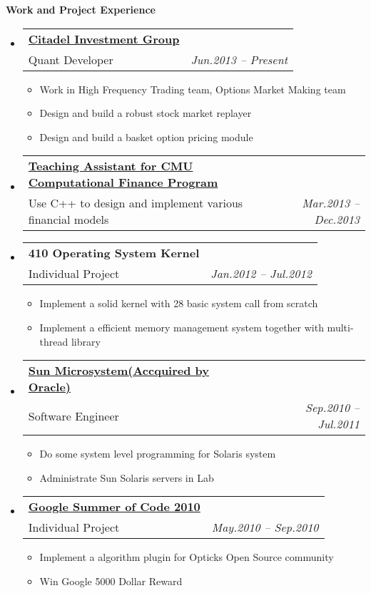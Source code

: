 \documentclass[letterpaper,11pt]{article}
\makeatletter
\newcommand{\resitem}[1]{\item #1 \vspace{-2pt}}
\newcommand{\resheading}[1]{{\large \colorbox{mygrey}{\begin{minipage}{\textwidth}{\textbf{#1 \vphantom{p\^{E}}}}\end{minipage}}}}
\newcommand{\ressubheading}[4]{
\begin{tabular*}{6.5in}{l@{\extracolsep{\fill}}r}
		\textbf{#1} & #2 \\
		{#3}{} & \textit{#4} \\
\end{tabular*}\vspace{-6pt}}
\makeatother
\begin{document}
\resheading{Work and Project Experience}
	\begin{itemize}
    \item
      \ressubheading{\href{http://www.citadel.com}
      {Citadel Investment Group}}{}
      {Quant Developer}{Jun.2013 -- Present}
      {\footnotesize
				\begin{itemize}
					\resitem{Work in High Frequency Trading team, 
          Options Market Making team}
          \resitem{Design and build a robust stock market replayer}
          \resitem{Design and build a basket option pricing module}
				\end{itemize}
			}

    \item 
			\ressubheading{
      \href{http://tepper.cmu.edu/master-in-computational-finance/index.aspx}
      {Teaching Assistant for CMU Computational Finance Program}}
      {}{Use C++ to design and implement various financial models}
      {Mar.2013 -- Dec.2013}
      
    \item 
			\ressubheading{410 Operating System Kernel}{}
      {Individual Project}{Jan.2012 -- Jul.2012}
      { \footnotesize
				\begin{itemize}
          \resitem{Implement a solid kernel with 28 basic system call from scratch}
					\resitem{Implement a efficient memory management system together with multi-thread library}
				\end{itemize}
			}

		\item 
			\ressubheading{\href{http://www.oracle.com/us/sun/index.html}
      {Sun Microsystem(Accquired by Oracle)}}{}
      {Software Engineer}
      {Sep.2010 -- Jul.2011}
      { \footnotesize
				\begin{itemize}
					\resitem{Do some system level programming for Solaris system}
					\resitem{Administrate Sun Solaris servers in Lab}
				\end{itemize}
			}

		\item 
      \ressubheading{\href{http://code.google.com/soc/}{Google Summer of Code 2010}}{}{Individual Project}{May.2010 -- Sep.2010}
				{ \footnotesize
				\begin{itemize}
					\resitem{Implement a algorithm plugin for Opticks Open Source community}
                    \resitem{Win Google 5000 Dollar Reward}
				\end{itemize}
				}
	\end{itemize}
\end{document}
